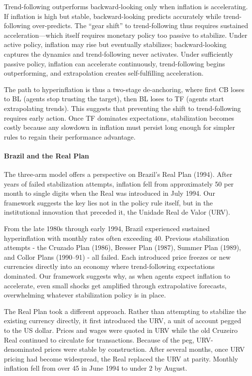 \documentclass[10pt]{article}
\begin{document}
Trend-following outperforms backward-looking only when inflation is accelerating. If inflation is high but stable, backward-looking predicts accurately while trend-following over-predicts. The ``gear shift'' to trend-following thus requires sustained acceleration—which itself requires monetary policy too passive to stabilize. Under active policy, inflation may rise but eventually stabilizes; backward-looking captures the dynamics and trend-following never activates. Under sufficiently passive policy, inflation can accelerate continuously, trend-following begins outperforming, and extrapolation creates self-fulfilling acceleration.

The path to hyperinflation is thus a two-stage de-anchoring, where first CB loses to BL (agents stop trusting the target), then BL loses to TF (agents start extrapolating trends). This suggests that preventing the shift to trend-following requires early action. Once TF dominates expectations, stabilization becomes costly because any slowdown in inflation must persist long enough for simpler rules to regain their performance advantage.

\paragraph{Brazil and the Real Plan} The three-arm model offers a perspective on Brazil's Real Plan (1994). After years of failed stabilization attempts, inflation fell from approximately 50 per month to single digits when the Real was introduced in July 1994. Our framework suggests the key lies not in the policy rule itself, but in the institutional innovation that preceded it, the Unidade Real de Valor (URV).

From the late 1980s through early 1994, Brazil experienced sustained hyperinflation with monthly rates often exceeding 40. Previous stabilization attempts - the Cruzado Plan (1986), Bresser Plan (1987), Summer Plan (1989), and Collor Plans (1990–91) - all failed. Each introduced price freezes or new currencies directly into an economy where trend-following expectations dominated. Our framework suggests why, as when agents expect inflation to accelerate, even small shocks get amplified through extrapolative forecasts, overwhelming whatever stabilization policy is in place.

The Real Plan took a different approach. Rather than attempting to stabilize the existing currency directly, it first introduced the URV, a unit of account pegged to the US dollar. Prices and wages were quoted in URV while the old Cruzeiro Real continued to circulate for transactions. Because of the peg, URV-denominated prices were stable by construction. After several months, once URV pricing had become widespread, the Real replaced the URV at parity. Monthly inflation fell from over 45 in June 1994 to under 2 by August.
\end{document}
